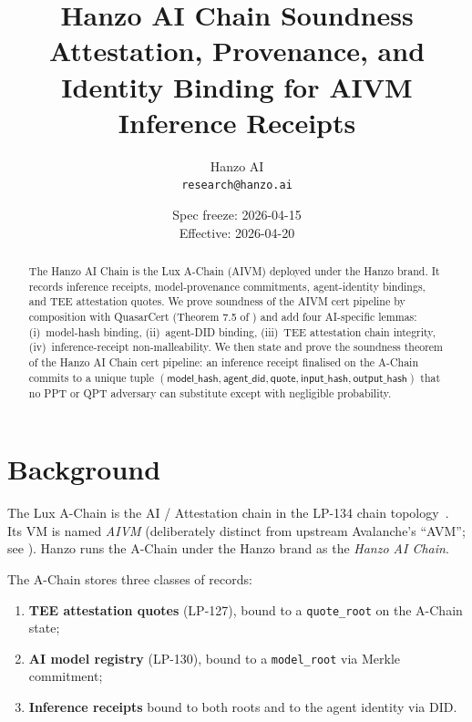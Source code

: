 \documentclass[11pt]{article}
\title{Hanzo AI Chain Soundness\\
{\large Attestation, Provenance, and Identity Binding for AIVM
Inference Receipts}}
\author{Hanzo AI\\
\texttt{research@hanzo.ai}}
\date{Spec freeze: 2026-04-15 \\ Effective: 2026-04-20}
\begin{document}
\maketitle

\begin{abstract}
The Hanzo AI Chain is the Lux A-Chain (AIVM) deployed under the Hanzo
brand. It records inference receipts, model-provenance commitments,
agent-identity bindings, and TEE attestation quotes. We prove
soundness of the AIVM cert pipeline by composition with QuasarCert
(Theorem 7.5 of \cite{quasar-cert}) and add four AI-specific lemmas:
(i)~model-hash binding, (ii)~agent-DID binding, (iii)~TEE attestation
chain integrity, (iv)~inference-receipt non-malleability.  We then
state and prove the soundness theorem of the Hanzo AI Chain cert
pipeline: an inference receipt finalised on the A-Chain commits to a
unique tuple
$(\mathsf{model\_hash}, \mathsf{agent\_did}, \mathsf{quote},
\mathsf{input\_hash}, \mathsf{output\_hash})$ that no PPT or QPT
adversary can substitute except with negligible probability.
\end{abstract}

\tableofcontents

\section{Background}
\label{sec:bg}

The Lux A-Chain is the AI / Attestation chain in the LP-134 chain
topology~\cite{lp134}. Its VM is named \emph{AIVM} (deliberately
distinct from upstream Avalanche's ``AVM''; see
\cite{taxonomy}). Hanzo runs the A-Chain under the Hanzo brand as the
\emph{Hanzo AI Chain}.

The A-Chain stores three classes of records:
\begin{enumerate}[nosep]
  \item \textbf{TEE attestation quotes} (LP-127), bound to a
        \texttt{quote\_root} on the A-Chain state;
  \item \textbf{AI model registry} (LP-130), bound to a
        \texttt{model\_root} via Merkle commitment;
  \item \textbf{Inference receipts} bound to both roots and to the
        agent identity via DID.
\end{enumerate}

\end{document}
